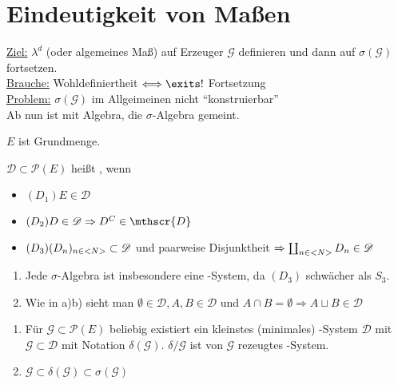 \section{Eindeutigkeit von Maßen}
\underline{Ziel:} $\lambda^d$ (oder algemeines Maß) auf Erzeuger $\mathscr{G}$ definieren und dann auf $\sigma(\mathscr{G})$ fortsetzen.\\
\underline{Brauche:} Wohldefiniertheit $\Longleftrightarrow \exits!$ Fortsetzung\\
\underline{Problem:} $\sigma(\mathscr{G})$ im Allgeimeinen nicht ``konstruierbar''\\
Ab nun ist mit Algebra, die $\sigma$-Algebra gemeint.

$E$ ist Grundmenge.

\begin{definition}
	$\mathscr{D} \subset \mathscr{P}(E)$ heißt , wenn
	\begin{itemize}
		\item $(D_1) E \in \mathscr{D}$
		\item $(D_2) D \in \mathscr{D} \Rightarrow D^C \in \mthscr{D}$
		\item $(D_3) (D_n)_{n\in <N>} \subset \mathscr{D}$ und paarweise Disjunktheit $\Rightarrow \coprod_{n \in <N>} D_n \in \mathscr{D}$
	\end{itemize}
\end{definition}

\begin{remark}
	\begin{enumerate}[label=(\alph*)]
		\item Jede $\sigma$-Algebra ist insbesondere eine -System, da $(D_3)$ schwächer als $S_3$.
		\item Wie in a)b) sieht man $\emptyset \in \mathscr{D}, A,B \in \mathscr{D}$ und $A \cap B = \emptyset \Rightarrow A \sqcup B \in \mathscr{D}$
	\end{enumerate}
\end{remark}

\begin{proposition}
	\begin{enumerate}[label=(\alph*)]
		\item Für $\mathscr{G} \subset \mathscr{P}(E)$ beliebig existiert ein kleinstes (minimales) -System $\mathscr{D}$ mit $\mathscr{G} \subset \mathscr{D}$ mit Notation $\delta(\mathscr{G})$. $\delta/\mathscr{G}$ ist von $\mathscr{G}$ rezeugtes -System.
		\item $\mathscr{G} \subset \delta(\mathscr{G}) \subset \sigma(\mathscr{G})$
	\end{enumerate}
\end{proposition}

